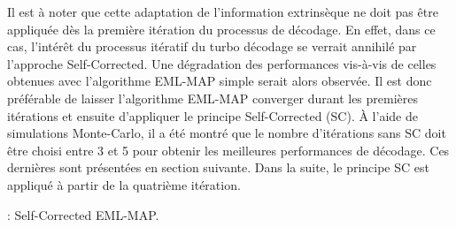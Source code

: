 Il est à noter que cette adaptation de l'information extrinsèque ne doit pas être appliquée dès la première itération 
du processus de décodage. En effet, dans ce cas, l’intérêt du processus itératif du turbo décodage se verrait annihilé par l'approche Self-Corrected.
Une dégradation des performances vis-à-vis de celles obtenues avec l'algorithme EML-MAP simple serait alors observée.
Il est donc préférable de laisser l'algorithme EML-MAP converger durant les premières itérations et ensuite d'appliquer le principe 
Self-Corrected (SC). À l'aide de simulations Monte-Carlo, il a été montré que le nombre d'itérations sans SC doit être 
choisi entre 3 et 5 pour obtenir les meilleures performances de décodage. Ces dernières sont présentées en section suivante.
Dans la suite, le principe SC est appliqué à partir de la quatrième itération.

\begin{center}
\begin{minipage}{.6\textwidth}%
	\begin{algorithm}[H]
		\DontPrintSemicolon
		
		{
			\DA\;
			{
			}
			\DB\;
			{
			}
		}
	\caption{: Self-Corrected EML-MAP.}
	\label{alg:sc1}
	\end{algorithm}
\end{minipage}
\end{center}

